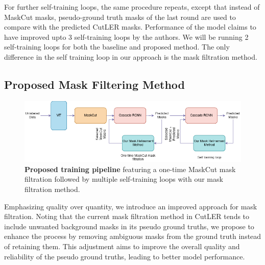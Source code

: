 For further self-training loops, the same procedure repeats, except that instead of MaskCut masks, pseudo-ground truth masks of the last round are used to compare with the predicted CutLER masks. Performance of the model claims to have improved upto 3 self-training loops by the authors. We will be running 2 self-training loops for both the baseline and proposed method. The only difference in the self training loop in our approach is the mask filtration method.

\subsection{Proposed Mask Filtering Method}
\label{section:proposed_method}

\begin{figure}
	\centering
	\includegraphics[width=1\textwidth]{Images/main/proposed_method.png}
	\caption[\textbf{Proposed Training Pipeline}]{\textbf{Proposed training pipeline} featuring a one-time MaskCut mask filtration followed by multiple self-training loops with our mask filtration method.}
	\label{fig:proposed_training}
\end{figure}
Emphasizing quality over quantity, we introduce an improved approach for mask filtration. Noting that the current mask filtration method in CutLER tends to include unwanted background masks in its pseudo ground truths, we propose to enhance the process by removing ambiguous masks from the ground truth instead of retaining them. This adjustment aims to improve the overall quality and reliability of the pseudo ground truths, leading to better model performance.

